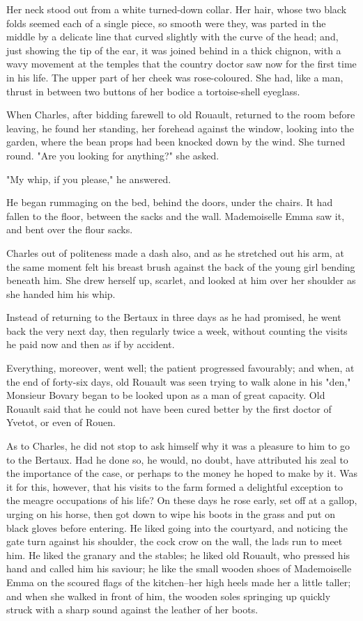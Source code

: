 \documentclass[11pt,twocolumn]{ltugboat}
\begin{document}
Her neck stood out from a white turned-down collar. Her hair, whose
two black folds seemed each of a single piece, so smooth were they, was
parted in the middle by a delicate line that curved slightly with the
curve of the head; and, just showing the tip of the ear, it was joined
behind in a thick chignon, with a wavy movement at the temples that the
country doctor saw now for the first time in his life. The upper part of
her cheek was rose-coloured. She had, like a man, thrust in between two
buttons of her bodice a tortoise-shell eyeglass.

When Charles, after bidding farewell to old Rouault, returned to the
room before leaving, he found her standing, her forehead against the
window, looking into the garden, where the bean props had been knocked
down by the wind. She turned round. "Are you looking for anything?" she
asked.

"My whip, if you please," he answered.

He began rummaging on the bed, behind the doors, under the chairs. It
had fallen to the floor, between the sacks and the wall. Mademoiselle
Emma saw it, and bent over the flour sacks.

Charles out of politeness made a dash also, and as he stretched out his
arm, at the same moment felt his breast brush against the back of the
young girl bending beneath him. She drew herself up, scarlet, and looked
at him over her shoulder as she handed him his whip.

Instead of returning to the Bertaux in three days as he had promised,
he went back the very next day, then regularly twice a week, without
counting the visits he paid now and then as if by accident.

Everything, moreover, went well; the patient progressed favourably; and
when, at the end of forty-six days, old Rouault was seen trying to walk
alone in his "den," Monsieur Bovary began to be looked upon as a man
of great capacity. Old Rouault said that he could not have been cured
better by the first doctor of Yvetot, or even of Rouen.

As to Charles, he did not stop to ask himself why it was a pleasure
to him to go to the Bertaux. Had he done so, he would, no doubt, have
attributed his zeal to the importance of the case, or perhaps to the
money he hoped to make by it. Was it for this, however, that his visits
to the farm formed a delightful exception to the meagre occupations of
his life? On these days he rose early, set off at a gallop, urging on
his horse, then got down to wipe his boots in the grass and put on black
gloves before entering. He liked going into the courtyard, and noticing
the gate turn against his shoulder, the cock crow on the wall, the lads
run to meet him. He liked the granary and the stables; he liked old
Rouault, who pressed his hand and called him his saviour; he like the
small wooden shoes of Mademoiselle Emma on the scoured flags of the
kitchen--her high heels made her a little taller; and when she walked in
front of him, the wooden soles springing up quickly struck with a sharp
sound against the leather of her boots.
\end{document}
